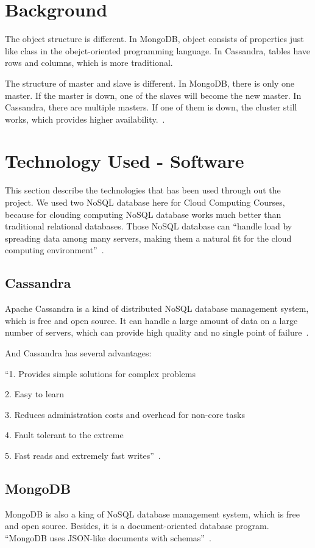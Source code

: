 \section{Background}
The object structure is different. In MongoDB, object consists of properties
 just like class in the obejct-oriented programming language. In Cassandra,
  tables have rows and columns, which is more traditional.

The structure of master and slave is different. In MongoDB, there is only 
one master. If the master is down, one of the slaves will become the new
 master. In Cassandra, there are multiple masters. If one of them is down,
  the cluster still works, which provides higher 
  availability.~\cite{hid-sp18-508-background}.

\section{Technology Used - Software}
This section describe the technologies that has been used through out 
the project.
We used two NoSQL database here for Cloud Computing Courses, 
because for clouding computing NoSQL database works much better
than traditional relational databases. Those NoSQL database can ``handle load
by spreading data among many servers, making them a natural fit for the 
cloud computing environment''~\cite{hid-sp18-508-nosql}.


\subsection{Cassandra}
Apache Cassandra is a kind of distributed NoSQL database management 
system, which is free and open source. It can handle a large amount of 
data on a large number of servers, which can provide high quality and no 
single point of failure~\cite{hid-sp18-508-cassandra}. 

And Cassandra has several advantages:

``1. Provides simple solutions for complex problems

2. Easy to learn

3. Reduces administration costs and overhead for non-core tasks

4. Fault tolerant to the extreme

5. Fast reads and extremely fast writes''~\cite{hid-sp18-508-cassandraAd}. 


\subsection{MongoDB}
MongoDB is also a king of NoSQL database management system, which 
is free and open source. Besides, it is a document-oriented database 
program. ``MongoDB uses JSON-like documents with 
schemas''~\cite{hid-sp18-508-mongodb}.

